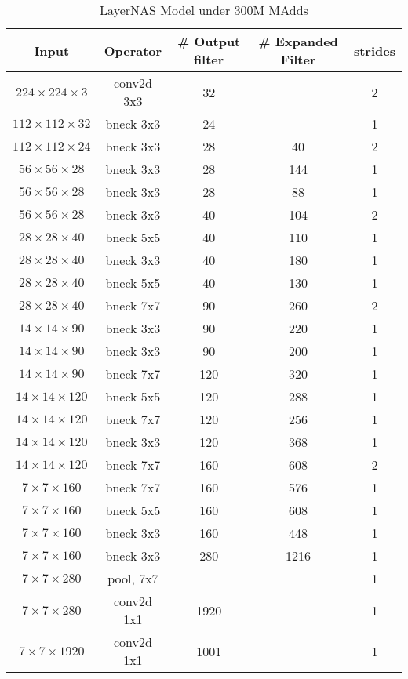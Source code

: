 \begin{table}
\caption{LayerNAS Model under 300M MAdds} 
\begin{center}

\begin{tabular}[hp]{c|c|c|c|c}
\hline
\hline
 Input &Operator  &\# Output filter &\# Expanded Filter &strides\\ 
\hline
 $224\times224\times3$ &conv2d 3x3 &32 & &2 \\
\hline
 $112\times112\times32$ &bneck 3x3 &24 & &1 \\
\hline
 $112\times112\times24$ &bneck 3x3 &28 &40 &2 \\
 $56\times56\times28$ &bneck 3x3 &28 &144 &1 \\
 $56\times56\times28$ &bneck 3x3 &28 &88 &1 \\
\hline
 $56\times56\times28$ &bneck 3x3 &40 &104 &2 \\
 $28\times28\times40$ &bneck 5x5 &40 &110 &1 \\
 $28\times28\times40$ &bneck 3x3 &40 &180 &1 \\
 $28\times28\times40$ &bneck 5x5 &40 &130 &1 \\
\hline
 $28\times28\times40$ &bneck 7x7 &90 &260 &2 \\
 $14\times14\times90$ &bneck 3x3 &90 &220 &1 \\
 $14\times14\times90$ &bneck 3x3 &90 &200 &1 \\
\hline
 $14\times14\times90$ &bneck 7x7 &120 &320 &1 \\
 $14\times14\times120$ &bneck 5x5 &120 &288 &1 \\
 $14\times14\times120$ &bneck 7x7 &120 &256 &1 \\
 $14\times14\times120$ &bneck 3x3 &120 &368 &1 \\
 \hline
 $14\times14\times120$ &bneck 7x7 &160 &608 &2 \\
 $7\times7\times160$ &bneck 7x7 &160 &576 &1 \\
 $7\times7\times160$ &bneck 5x5 &160 &608 &1 \\
 $7\times7\times160$ &bneck 3x3 &160 &448 &1 \\
 \hline
 $7\times7\times160$ &bneck 3x3 &280 &1216 &1 \\
\hline
 $7\times7\times280$ &pool, 7x7  & & &1\\
 $7\times7\times280$ &conv2d 1x1  &1920 & &1 \\
 $7\times7\times1920$ &conv2d 1x1 &1001 & &1 \\
\hline
\hline

\end{tabular}
\end{center}
\end{table}


